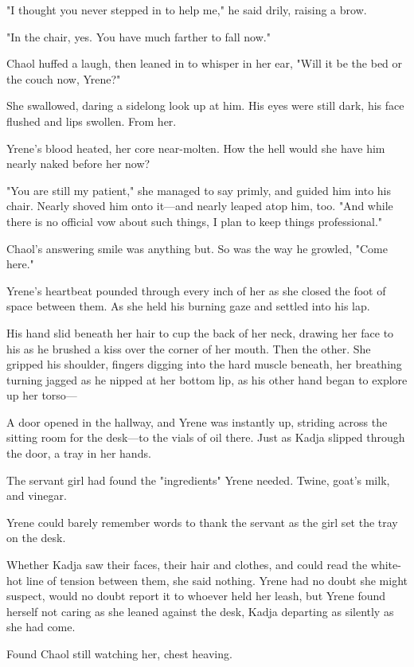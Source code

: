 "I thought you never stepped in to help me," he said drily, raising a brow.

"In the chair, yes. You have much farther to fall now."

Chaol huffed a laugh, then leaned in to whisper in her ear, "Will it be the bed or the couch now, Yrene?"

She swallowed, daring a sidelong look up at him. His eyes were still dark, his face flushed and lips swollen. From her.

Yrene's blood heated, her core near-molten. How the hell would she have him nearly naked before her now?

"You are still my patient," she managed to say primly, and guided him into his chair. Nearly shoved him onto it---and nearly leaped atop him, too. "And while there is no official vow about such things, I plan to keep things professional."

Chaol's answering smile was anything but. So was the way he growled, "Come here."

Yrene's heartbeat pounded through every inch of her as she closed the foot of space between them. As she held his burning gaze and settled into his lap.

His hand slid beneath her hair to cup the back of her neck, drawing her face to his as he brushed a kiss over the corner of her mouth. Then the other. She gripped his shoulder, fingers digging into the hard muscle beneath, her breathing turning jagged as he nipped at her bottom lip, as his other hand began to explore up her torso---

A door opened in the hallway, and Yrene was instantly up, striding across the sitting room for the desk---to the vials of oil there. Just as Kadja slipped through the door, a tray in her hands.

The servant girl had found the "ingredients" Yrene needed. Twine, goat's milk, and vinegar.

Yrene could barely remember words to thank the servant as the girl set the tray on the desk.

Whether Kadja saw their faces, their hair and clothes, and could read the white-hot line of tension between them, she said nothing. Yrene had no doubt she might suspect, would no doubt report it to whoever held her leash, but  Yrene found herself not caring as she leaned against the desk, Kadja departing as silently as she had come.

Found Chaol still watching her, chest heaving.

